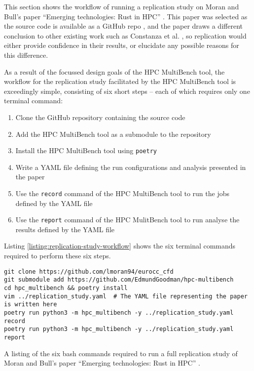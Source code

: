 This section shows the workflow of running a replication study on Moran and Bull's paper ``Emerging technologies: Rust in HPC'' \cite{moranEmergingTechnologiesRust2023}. This paper was selected as the source code is available as a GitHub repo \cite{}, and the paper draws a different conclusion to other existing work such as Constanza et al. \cite{costanzoPerformanceVsProgramming2021}, so replication would either provide confidence in their results, or elucidate any possible reasons for this difference.

As a result of the focussed design goals of the HPC MultiBench tool, the workflow for the replication study facilitated by the HPC MultiBench tool is exceedingly simple, consisting of six short steps -- each of which requires only one terminal command:

\begin{enumerate}
    \item Clone the GitHub repository containing the source code
    \item Add the HPC MultiBench tool as a submodule to the repository
    \item Install the HPC MultiBench tool using \texttt{poetry}
    \item Write a YAML file defining the run configurations and analysis presented in the paper
    \item Use the \texttt{record} command of the HPC MultiBench tool to run the jobs defined by the YAML file
    \item Use the \texttt{report} command of the HPC MulitBench tool to run analyse the results defined by the YAML file
\end{enumerate}

Listing \ref{listing:replication-study-workflow} shows the six terminal commands required to perform these six steps.

\begin{listing}[H]
    \begin{verbatim}
git clone https://github.com/lmoran94/eurocc_cfd
git submodule add https://github.com/EdmundGoodman/hpc-multibench
cd hpc_multibench && poetry install
vim ../replication_study.yaml  # The YAML file representing the paper is written here
poetry run python3 -m hpc_multibench -y ../replication_study.yaml record
poetry run python3 -m hpc_multibench -y ../replication_study.yaml report
    \end{verbatim}
    \caption{A listing of the six bash commands required to run a full replication study of Moran and Bull's paper ``Emerging technologies: Rust in HPC'' \cite{moranEmergingTechnologiesRust2023}.}
    \label{listing:replication-study-workflow}
\end{listing}

